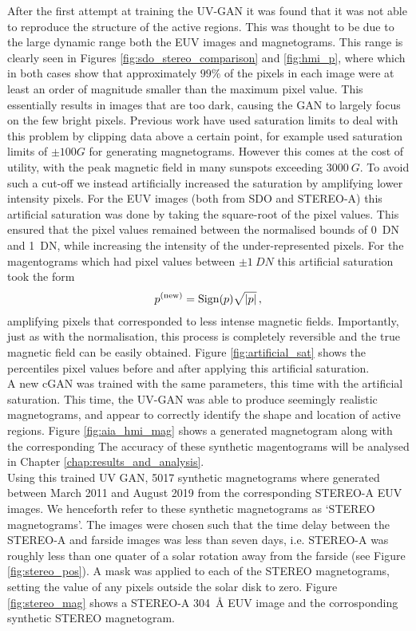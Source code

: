 \documentclass[11pt,a4paper,onecolumn]{report}
\begin{document}
After the first attempt at training the UV-GAN it was found that it was not able
to reproduce the structure of the active regions. This was thought to be due to
the large dynamic range both the EUV images and magnetograms. This range is
clearly seen in Figures \ref{fig:sdo_stereo_comparison} and \ref{fig:hmi_p},
where which in both cases show that approximately $99\%$ of the pixels in each
image were at least an order of magnitude smaller than the maximum pixel value.
This essentially results in images that are too dark, causing the GAN to largely
focus on the few bright pixels. Previous work have used saturation limits to
deal with this problem by clipping data above a certain point, \citet{Kim2019}
for example used saturation limits of $\pm 100G$ for generating magnetograms.
However this comes at the cost of utility, with the peak magnetic field in many
sunspots exceeding $\SI[]{3000}[]{G}$. To avoid such a cut-off we instead
artificially increased the saturation by amplifying lower intensity pixels. For
the EUV images (both from SDO and STEREO-A) this artificial saturation was done
by taking the square-root of the pixel values. This ensured that the pixel
values remained between the normalised bounds of \SI{0}{DN} and \SI{1}{DN},
while increasing the intensity of the under-represented pixels. For the
magentograms which had pixel values between $\pm \SI{1}{DN}$ this artificial
saturation took the form
\begin{align}
  p^{(\text{new})} = \text{Sign}(p)\sqrt{\absolutevalue{p}}\, ,
\end{align}
amplifying pixels that corresponded to less intense magnetic fields.
Importantly, just as with the normalisation, this process is completely
reversible and the true magnetic field can be easily obtained. Figure
\ref{fig:artificial_sat} shows the percentiles pixel values before and after applying this
artificial saturation. \\


A new cGAN was trained with the same parameters, this time with the artificial
saturation. This time, the UV-GAN was able to produce seemingly realistic
magnetograms, and appear to correctly identify the shape and location of active
regions. Figure \ref{fig:aia_hmi_mag} shows a generated magnetogram along with
the corresponding  The accuracy of these synthetic magentograms will be analysed in
Chapter \ref{chap:results_and_analysis}. \\


Using this trained UV GAN, 5017 synthetic magnetograms where generated between
March 2011 and August 2019 from the corresponding STEREO-A EUV images. We
henceforth refer to these synthetic magnetograms as `STEREO magnetograms'. The
images were chosen such that the time delay between the STEREO-A and farside
images was less than seven days, i.e. STEREO-A was roughly less than one quater
of a solar rotation away from the farside (see Figure \ref{fig:stereo_pos}). A
mask was applied to each of the STEREO magnetograms, setting the value of any
pixels outside the solar disk to zero. Figure \ref{fig:stereo_mag} shows a
STEREO-A \SI{304}{\angstrom} EUV image and the corrosponding synthetic STEREO
magnetogram.
\end{document}
